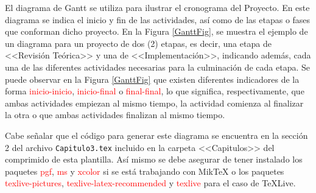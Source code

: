 El diagrama de Gantt se utiliza para ilustrar el cronograma del Proyecto. En este diagrama se indica el inicio y fin de las actividades, así como de las etapas o fases que conforman dicho proyecto. En la Figura \ref{GanttFig}, se muestra el ejemplo de un diagrama para un proyecto de dos (2) etapas, es decir, una etapa de <<Revisión Teórica>> y una de <<Implementación>>, indicando además, cada una de las diferentes actividades necesarias para la culminación de cada etapa. Se puede observar en la Figura \ref{GanttFig} que existen diferentes indicadores de la forma  \textcolor{red}{inicio-inicio}, \textcolor{red}{inicio-final} o \textcolor{red}{final-final}, lo que significa, respectivamente, que ambas actividades empiezan al mismo tiempo, la actividad comienza al finalizar la otra o que ambas actividades finalizan al mismo tiempo.

Cabe señalar que el código para generar este diagrama se encuentra en la sección 2 del archivo \texttt{Capitulo3.tex} incluido en la carpeta <<Capitulos>> del comprimido de esta plantilla. Así mismo se debe asegurar de tener instalado los paquetes \textcolor{red}{pgf}, \textcolor{red}{ms} y \textcolor{red}{xcolor} si se está trabajando con MikTeX o los paquetes \textcolor{red}{texlive-pictures}, \textcolor{red}{texlive-latex-recommended} y \textcolor{red}{texlive} para el caso de TeXLive.


